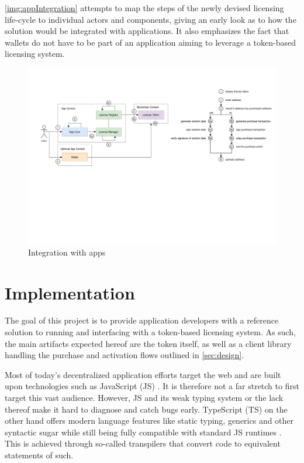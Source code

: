 \documentclass{egpubl}
\begin{document}
\autoref{img:appIntegration} attempts to map the steps of the newly devised licensing life-cycle to individual actors and components, giving an early look as to how the solution would be integrated with applications. It also emphasizes the fact that wallets do not have to be part of an application aiming to leverage a token-based licensing system. 

\begin{figure}[htbp]
	\centering
	\setlength{\fboxsep}{1pt}
   	\setlength{\fboxrule}{1pt}	
	
	\includegraphics[width=1\linewidth]{images/app_integration.pdf}
	\caption{Integration with apps}
	\label{img:appIntegration}
\end{figure}

\FloatBarrier


\section{Implementation}
The goal of this project is to provide application developers with a reference solution to running and interfacing with a token-based licensing system. As such, the main artifacts expected hereof are the token itself, as well as a client library handling the purchase and activation flows outlined in \autoref{sec:design}.

Most of today's decentralized application efforts target the web and are built upon technologies such as JavaScript (JS) \cite{goodman2007javascript}. It is therefore not a far stretch to first target this vast audience. However, JS and its weak typing system or the lack thereof make it hard to diagnose and catch bugs early. TypeScript (TS) on the other hand offers modern language features like static typing, generics and other syntactic sugar while still being fully compatible with standard JS runtimes \cite{bierman2014understanding}. This is achieved through so-called transpilers that convert code to equivalent statements of such.
\end{document}
